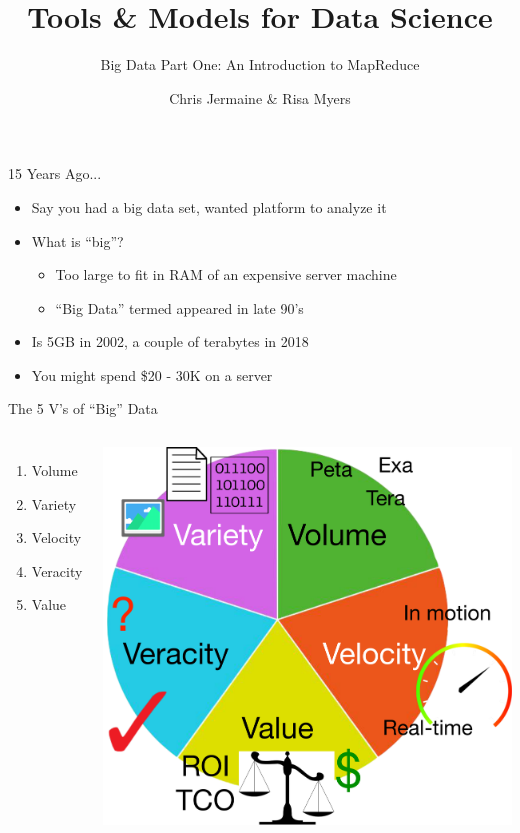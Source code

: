 \documentclass[aspectratio=169]{beamer}
\title[]
{Tools \& Models for Data Science}
\subtitle{Big Data Part One: An Introduction to MapReduce}
\author[]{Chris Jermaine \& Risa Myers}
\institute
{
  Rice University 
}
\date[]{}
\begin{document}
\begin{frame}
 \titlepage
\end{frame}


\begin{frame}{15 Years Ago...}

\begin{itemize}
\item Say you had a big data set, wanted platform to analyze it
\item What is ``big''?
	\begin{itemize}
	\item Too large to fit in RAM of an expensive server machine
	\item ``Big Data'' termed appeared in late 90's %
	\end{itemize}
\item Is 5GB in 2002, a couple of terabytes in 2018
\item You might spend \$20 - 30K on a server
\end{itemize}
\end{frame}
\begin{frame}{The 5 V's of ``Big'' Data}
\begin{columns}[c]
\begin{enumerate}
\item Volume %
\item Variety  %
\item Velocity %
\item Veracity %
\item Value %
\end{enumerate}
    	{\includegraphics[width=1\textwidth]{./lectBigData/5vsV2.pdf}} \\
\end{columns}
\end{frame}
\end{document}
